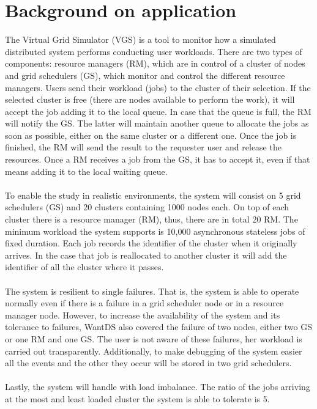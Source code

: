 \section{Background on application}
The Virtual Grid Simulator (VGS) is a tool to monitor how a simulated distributed system performs conducting user workloads. There are two types of components: resource managers (RM), which are in control of a cluster of nodes and grid schedulers (GS), which monitor and control the different resource managers. Users send their workload (jobs) to the cluster of their selection. If the selected cluster is free (there are nodes available to perform the work), it will accept the job adding it to the local queue. In case that the queue is full, the RM will notify the GS. The latter will maintain another queue to allocate the jobs as soon as possible, either on the same cluster or a different one. Once the job is finished, the RM will send the result to the requester user and release the resources. Once a RM receives a job from the GS, it has to accept it, even if that means adding it to the local waiting queue. 
\\\\
To enable the study in realistic environments, the system will consist on 5 grid schedulers (GS) and 20 clusters containing 1000 nodes each. On top of each cluster there is a resource manager (RM), thus, there are in total 20 RM. The minimum workload the system supports is 10,000 asynchronous stateless jobs of fixed duration. Each job records the identifier of the cluster when it originally arrives. In the case that job is reallocated to another cluster it will add the identifier of all the cluster where it passes.
\\\\
The system is resilient to single failures. That is, the system is able to operate normally even if there is a failure in a grid scheduler node or in a resource manager node. However, to increase the availability of the system and its tolerance to failures, WantDS also covered the failure of two nodes, either two GS or one RM and one GS. The user is not aware of these failures, her workload is carried out transparently. Additionally, to make debugging of the system easier all the events and the other they occur will be stored in two grid schedulers.
\\\\
Lastly, the system will handle with load imbalance. The ratio of the jobs arriving at the most and least loaded cluster the system is able to tolerate is 5.
